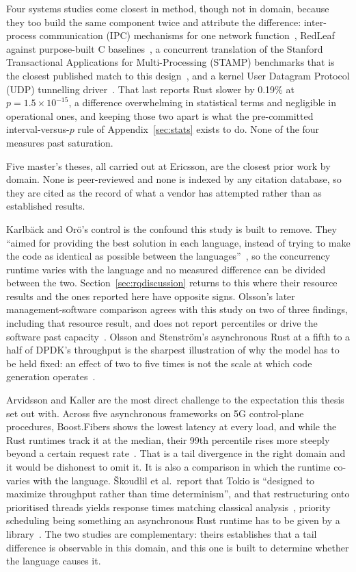 \documentclass[english,oneside,a4paper,censored,csm,software-track-2020]{HYthesisML}
\begin{document}
\begin{appendices}
Four systems studies come closest in method, though not in domain, because they too build the
same component twice and attribute the difference: inter-process communication (IPC) mechanisms
for one network function~\cite{li2021ipc}, RedLeaf against purpose-built C
baselines~\cite{narayanan2020redleaf}, a concurrent translation of the Stanford Transactional
Applications for Multi-Processing (STAMP) benchmarks that is the closest published match to this
design~\cite{suchert2023stamp}, and a kernel User Datagram Protocol (UDP) tunnelling
driver~\cite{gonzalez2023rustudp}. That last reports Rust slower by 0.19\% at $p = 1.5 \times
10^{-15}$, a difference overwhelming in statistical terms and negligible in operational ones, and
keeping those two apart is what the pre-committed interval-versus-$p$ rule of
Appendix~\ref{sec:stats} exists to do. None of the four measures past saturation.

Five master's theses, all carried out at Ericsson, are the closest prior work by domain. None is
peer-reviewed and none is indexed by any citation database, so they are cited as the record of
what a vendor has attempted rather than as established results.

Karlb\"ack and Or\"o's control is the confound this study is built to remove. They ``aimed for
providing the best solution in each language, instead of trying to make the code as identical as
possible between the languages''~\cite{karlback2021ran}, so the concurrency runtime varies with
the language and no measured difference can be divided between the two.
Section~\ref{sec:rqdiscussion} returns to this where their resource results and the ones reported
here have opposite signs. Olsson's later management-software comparison agrees with this study on
two of three findings, including that resource result, and does not report percentiles or drive
the software past capacity~\cite{olsson2023ranmgmt}. Olsson and Stenstr\"om's asynchronous Rust at
a fifth to a half of DPDK's throughput is the sharpest illustration of why the model has to be
held fixed: an effect of two to five times is not the scale at which code generation
operates~\cite{olsson2023asyncpackets}.

Arvidsson and Kaller are the most direct challenge to the expectation this thesis set out with.
Across five asynchronous frameworks on 5G control-plane procedures, Boost.Fibers shows the lowest
latency at every load, and while the Rust runtimes track it at the median, their 99th percentile
rises more steeply beyond a certain request rate~\cite{arvidsson2025async}. That is a tail
divergence in the right domain and it would be dishonest to omit it. It is also a comparison in
which the runtime co-varies with the language. \v{S}koudlil et al.\ report that Tokio is
``designed to maximize throughput rather than time determinism'', and that restructuring onto
prioritised threads yields response times matching classical
analysis~\cite{skoudlil2025asyncrust}, priority scheduling being something an asynchronous Rust
runtime has to be given by a library~\cite{zhuang2026flowprioritize}. The two studies are
complementary: theirs establishes that a tail difference is observable in this domain, and this
one is built to determine whether the language causes it.


\end{appendices}
\end{document}

